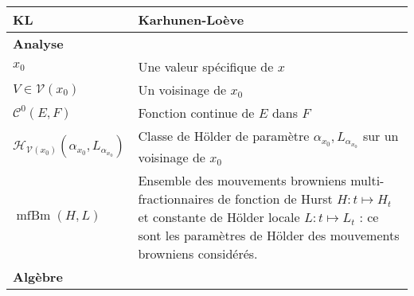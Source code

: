 \begin{table}[H]
\begin{tabularx}{\textwidth}{lX}
		KL                                                               & Karhunen-Loève                                                                                                                                                                                                                    \\
		\midrule
		\textbf{Analyse}                                                 &                                                                                                                                                                                                                                   \\
		\midrule
		$x_0$                                                            & Une valeur spécifique de $x$                                                                                                                                                                                                      \\
		$V \in \mathcal{V}(x_0)$                                         & Un voisinage de $x_0$                                                                                                                                                                                                             \\
		$\mathcal C^0(E, F)$                                             & Fonction continue de $E$ dans $F$                                                                                                                                                                                                 \\
		$\mathcal{H}_{\mathcal{V}(x_0)}(\alpha_{x_0}, L_{\alpha_{x_0}})$ & Classe de Hölder de paramètre $\alpha_{x_0}, L_{\alpha_{x_0}}$ sur un voisinage de $x_0$                                                                                                                                          \\
		$\operatorname{mfBm}(H, L)$                                      & Ensemble des mouvements browniens multi-fractionnaires de fonction de Hurst $H : t \mapsto H_t$ et constante de Hölder locale $L : t \mapsto L_t$ : ce sont les \og paramètres de Hölder \fg des mouvements browniens considérés. \\
		\midrule
		\textbf{Algèbre}                                                 &                                                                                                                                                                                                                                   \\

\end{tabularx}
\end{table}
